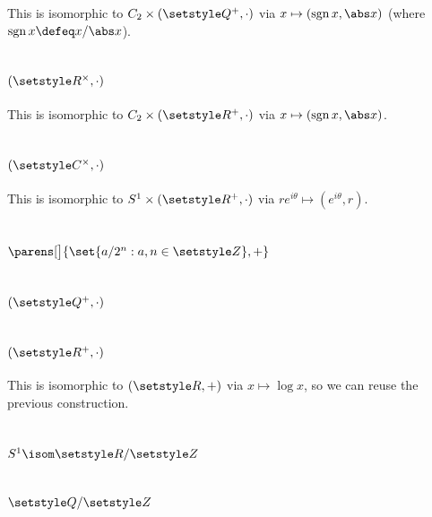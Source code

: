 \documentclass[fleqn,a4paper,11pt]{article}
\begin{document}
This is isomorphic to \(C_2 \times (\Rationals^+, \cdot)\) via
\(x \mapsto (\sgn x, \abs x)\) (where \(\sgn x \defeq x/\abs x\)).

\section{\((\Reals^\times, \cdot)\)}

This is isomorphic to \(C_2 \times (\Reals^+, \cdot)\) via
\(x \mapsto (\sgn x, \abs x)\).

\section{\((\Complex^\times, \cdot)\)}

This is isomorphic to \(S^1 \times (\Reals^+, \cdot)\) via
\(re^{i\theta} \mapsto (e^{i\theta}, r)\).

\section{\(\parens[\big]{\set{a / 2^n : a, n \in \Integers}, +}\)}

\section{\((\Rationals^+, \cdot)\)}

\section{\((\Reals^+, \cdot)\)}

This is isomorphic to \((\Reals, +)\) via \(x \mapsto \log x\), so we can reuse
the previous construction.

\section{\(S^1 \isom \Reals / \Integers\)}

\section{\(\Rationals / \Integers\)}
\end{document}
